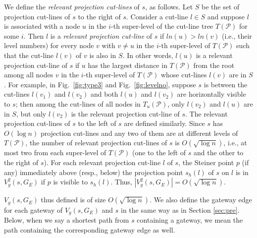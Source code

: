 \documentclass[english,runningheads,11pt]{llncs}
\def\calP{\mathcal{P}}
\begin{document}
 We define the {\em relevant projection
cut-lines} of $s$, as follows. Let $S$ be the set of projection cut-lines of
$s$ to the right of $s$.  Consider a cut-line $l\in S$
and suppose $l$ is associated with a node $u$ in the $i$-th super-level
of the cut-line tree $T(\calP)$ for some $i$. Then $l$ is a {\em relevant
projection cut-line} of $s$ if $ln(u)> ln(v)$ (i.e., their level
numbers) for every node $v$ with $v\neq u$ in the
$i$-th super-level of $T(\calP)$
such that the cut-line $l(v)$ of $v$ is also in $S$. In other words,
$l(u)$ is a relevant projection cut-line of $s$ if $u$ has the largest distance
in $T(\calP)$ from the root
among all nodes $v$ in the $i$-th super-level of $T(\calP)$ whose
cut-lines $l(v)$ are in $S$. For example, in Fig.~\ref{fig:type3} and Fig.~\ref{fig:levelno}, suppose $s$ is between the cut-lines $l(v_1)$ and $l(v_2)$ and both $l(u)$ and $l(v_2)$ are horizontally visible to $s$; then among the cut-lines of all nodes in $T_u(\calP)$, only $l(v_2)$ and $l(u)$ are in $S$, but only $l(v_2)$ is the relevant projection cut-line of $s$.  The relevant projection cut-lines
of $s$ to the left of $s$ are defined similarly.  Since $s$ has $O(\log
n)$ projection cut-lines and any two of them are at different levels
of $T(\calP)$, the number of relevant projection cut-lines of $s$ is
$O(\sqrt{\log n})$, i.e., at most two from each super-level of
$T(\calP)$ (one to the left of $s$ and the other to the right of $s$). For each relevant projection cut-line $l$ of $s$, the Steiner point $p$
(if any) immediately above (resp., below) the projection point $s_h(l)$ of $s$ on $l$ is in
$V^2_g(s,G_E)$ if $p$ is visible to $s_h(l)$. Thus,
$|V^2_g(s,G_E)|=O(\sqrt{\log n})$.

$V_g(s,G_E)$ thus defined is of size
$O(\sqrt{\log n})$. We also define the gateway edge for
each gateway of $V_g(s,G_E)$ and $s$ in the same way as in Section \ref{sec:pre}.
Below, when we say a shortest path from $s$ containing a gateway, we
mean the path containing the corresponding gateway edge as well.
\end{document}
